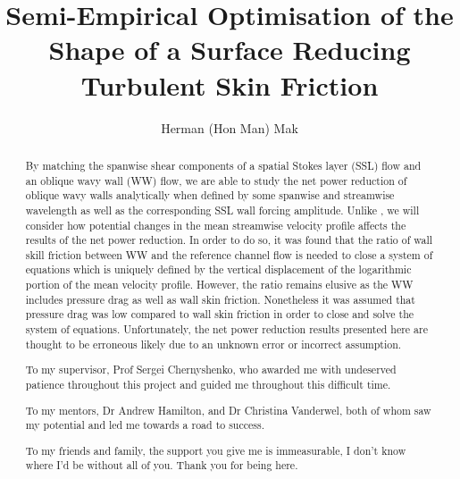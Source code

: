 \documentclass[a4paper, twoside]{report}
\title{Semi-Empirical Optimisation of the Shape of a Surface Reducing Turbulent Skin Friction}
\author{Herman (Hon Man) Mak}
\begin{document}


\begin{titlepage}
\begin{abstract}
	By matching the spanwise shear components of a spatial Stokes layer (SSL) flow and an oblique wavy wall (WW) flow, we are able to study the net power reduction of oblique wavy walls analytically when defined by some spanwise and streamwise wavelength as well as the corresponding SSL wall forcing amplitude. Unlike \textcite{chernyshenko2013}, we will consider how potential changes in the mean streamwise velocity profile affects the results of the net power reduction. In order to do so, it was found that the ratio of wall skill friction between WW and the reference channel flow is needed to close a system of equations which is uniquely defined by the vertical displacement of the logarithmic portion of the mean velocity profile. However, the ratio remains elusive as the WW includes pressure drag as well as wall skin friction. Nonetheless it was assumed that pressure drag was low compared to wall skin friction in order to close and solve the system of equations. Unfortunately, the net power reduction results presented here are thought to be erroneous likely due to an unknown error or incorrect assumption.
\end{abstract}

\renewcommand{\abstractname}{Acknowledgements}
\begin{abstract}
	To my supervisor, Prof Sergei Chernyshenko, who awarded me with undeserved patience throughout this project and guided me throughout this difficult time.

	To my mentors, Dr Andrew Hamilton, and Dr Christina Vanderwel, both of whom saw my potential and led me towards a road to success.

	To my friends and family, the support you give me is immeasurable, I don't know where I'd be without all of you. Thank you for being here.
\end{abstract}
\end{titlepage}

\tableofcontents
\listoffigures


\glsaddall
\printnoidxglossaries


%

%


\printbibliography
{}


\end{document}
